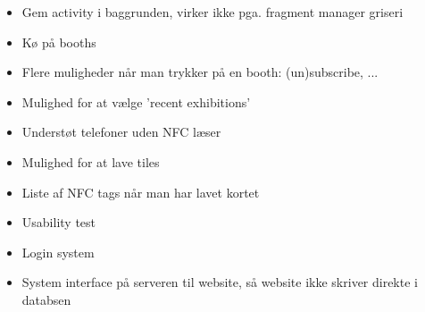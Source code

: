 \begin{itemize}
\item Gem activity i baggrunden, virker ikke pga. fragment manager griseri
\item Kø på booths
\item Flere muligheder når man trykker på en booth: (un)subscribe, ...
\item Mulighed for at vælge 'recent exhibitions'
\item Understøt telefoner uden NFC læser
\item Mulighed for at lave tiles
\item Liste af NFC tags når man har lavet kortet
\item Usability test
\item Login system
\item System interface på serveren til website, så website ikke skriver direkte i databsen
\end{itemize}